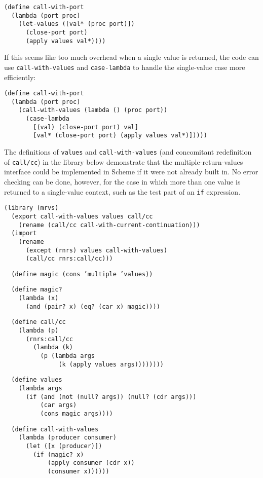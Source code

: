 \begin{alltt}
(define call-with-port\label{control_defn_call_with_port}
  (lambda (port proc)
    (let-values ([val* (proc port)])
      (close-port port)
      (apply values val*))))
\end{alltt}


If this seems like too much overhead when a single value is returned,
the code can use \texttt{call-with-values} and \texttt{case-lambda} to
handle the single-value case more efficiently:


\begin{alltt}
(define call-with-port
  (lambda (port proc)
    (call-with-values (lambda () (proc port))
      (case-lambda
        [(val) (close-port port) val]
        [val* (close-port port) (apply values val*)]))))
\end{alltt}


The definitions of \texttt{values} and \texttt{call-with-values} (and
concomitant redefinition of \texttt{call/cc}) in the library below
demonstrate that the multiple-return-values interface could be implemented
in Scheme if it were not already built in.
No error checking can be done, however, for the case in which more than one
value is returned to a single-value context, such as the test part
of an \texttt{if} expression.


\begin{alltt}
(library (mrvs)
  (export call-with-values values call/cc
    (rename (call/cc call-with-current-continuation)))
  (import
    (rename
      (except (rnrs) values call-with-values)
      (call/cc rnrs:call/cc)))

  (define magic (cons 'multiple 'values))

  (define magic?
    (lambda (x)
      (and (pair? x) (eq? (car x) magic))))
\end{alltt}


\begin{alltt}
  (define call/cc
    (lambda (p)
      (rnrs:call/cc
        (lambda (k)
          (p (lambda args
               (k (apply values args))))))))

  (define values
    (lambda args
      (if (and (not (null? args)) (null? (cdr args)))
          (car args)
          (cons magic args))))

  (define call-with-values
    (lambda (producer consumer)
      (let ([x (producer)])
        (if (magic? x)
            (apply consumer (cdr x))
            (consumer x))))))
\end{alltt}


